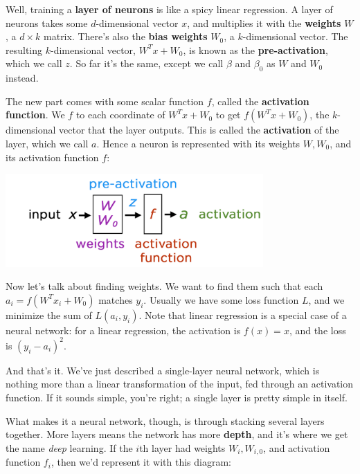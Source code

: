 \documentclass[11pt,paper=letter]{scrartcl}
\begin{document}
Well, training a \textbf{layer of neurons} is like a spicy linear regression. A layer of neurons takes some $d$-dimensional vector $x$, and multiplies it with the \textbf{weights} $W$, a $d \times k$ matrix. There's also the \textbf{bias weights} $W_0$, a $k$-dimensional vector. The resulting $k$-dimensional vector, $W^Tx + W_0$, is known as the \textbf{pre-activation}, which we call $z$. So far it's the same, except we call $\beta$ and $\beta_0$ as $W$ and $W_0$ instead.

The new part comes with some scalar function $f$, called the \textbf{activation function}. We $f$ to each coordinate of $W^Tx + W_0$ to get $f(W^Tx + W_0)$, the $k$-dimensional vector that the layer outputs. This is called the \textbf{activation} of the layer, which we call $a$. Hence a neuron is represented with its weights $W, W_0$, and its activation function $f$:

\begin{center}
  \includegraphics[height=1.4in]{25.png}
\end{center}

Now let's talk about finding weights. We want to find them such that each $a_i = f(W^Tx_i + W_0)$ matches $y_i$. Usually we have some loss function $L$, and we minimize the sum of $L(a_i, y_i)$. Note that linear regression is a special case of a neural network: for a linear regression, the activation is $f(x) = x$, and the loss is $(y_i - a_i)^2$.


And that's it. We've just described a single-layer neural network, which is nothing more than a linear transformation of the input, fed through an activation function. If it sounds simple, you're right; a single layer is pretty simple in itself.

What makes it a neural network, though, is through stacking several layers together. More layers means the network has more \textbf{depth}, and it's where we get the name \textit{deep} learning. If the $i$th layer had weights $W_i, W_{i, 0}$, and activation function $f_i$, then we'd represent it with this diagram:
\end{document}
